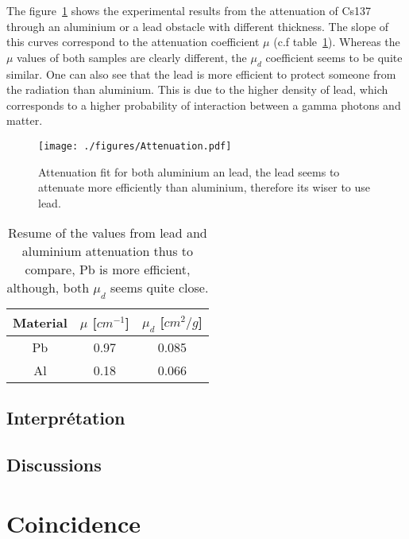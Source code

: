 \documentclass[a4paper,12pt,oneside]{article}
\begin{document}
The figure~\ref{fig:attenuation} shows the experimental results from the attenuation of Cs137 through an aluminium or a lead obstacle with different thickness. The slope of this curves correspond to the attenuation coefficient $\mu$ (c.f table~\ref{tab:attenuation}).
Whereas the $\mu$ values of both samples are clearly different, the $\mu_d$ coefficient seems to be quite similar. One can also see that the lead is more efficient to protect someone from the radiation than aluminium. This is due to the higher density of lead, which corresponds to a higher probability of interaction between a gamma photons and matter.

\begin{figure}[h!]
	\begin{center}
	\texttt{[image: ./figures/Attenuation.pdf]}
	\caption{Attenuation fit for both aluminium an lead, the lead seems to attenuate more efficiently than aluminium, therefore its wiser to use lead.} \label{fig:attenuation}
	\end{center}
\end{figure}

\begin{table}[h!]
\centering
	\begin{tabular}{|c|c|c|}
		 \hline
		Material & $\mu$ [$cm^{-1}$] & $\mu_d$ [$cm^2/g$]\\
		\hline
		Pb	& 0.97 & 0.085 \\
		Al	& 0.18 & 0.066 \\
			\hline
	\end{tabular}
	\caption{Resume of the values from lead and aluminium attenuation thus to compare, Pb is more efficient, although, both $\mu_d$ seems quite close.}
	\label{tab:attenuation}
\end{table}

\subsection{Interprétation}

\subsection{Discussions}

\section{Coincidence}
\end{document}

